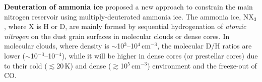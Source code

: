\documentclass[12pt,a4paper]{article}  %
\begin{document}
\medskip
\noindent \textbf{Deuteration of ammonia ice} \quad  %
\citet{Furuya18} proposed a new approach to constrain the main nitrogen reservoir using multiply-deuterated ammonia ice. The ammonia ice, NX$_3$, where X is H or D, are mainly formed by sequential hydrogenation of \textit{atomic nitrogen} on the dust grain surfaces in molecular clouds or dense cores. 
In molecular clouds, where density is $\sim$10$^3$--10$^4$\,cm$^{-3}$, the molecular D/H ratios are lower ($\sim$10$^{-3}$--10$^{-4}$), while it will be higher in dense cores (or prestellar cores) due to their cold ($\lesssim$20\,K) and dense ($\gtrsim$10$^5$\,cm$^{-3}$) environment and the freeze-out of CO.
\end{document}
